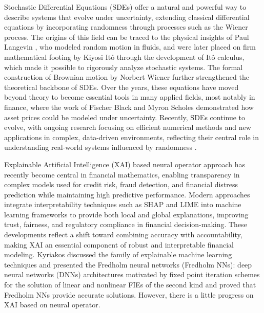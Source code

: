 \documentclass[preprint,12pt,authoryear]{elsarticle}
\begin{document}
Stochastic Differential Equations (SDEs) offer a natural and powerful way to describe systems that evolve under uncertainty, extending classical differential equations by incorporating randomness through processes such as the Wiener process. The origins of this field can be traced to the physical insights of Paul Langevin \cite{langevin1908}, who modeled random motion in fluids, and were later placed on firm mathematical footing by Kiyosi Itô \cite{ito1944} through the development of Itô calculus, which made it possible to rigorously analyze stochastic systems. The formal construction of Brownian motion by Norbert Wiener \cite{wiener1923} further strengthened the theoretical backbone of SDEs. Over the years, these equations have moved beyond theory to become essential tools in many applied fields, most notably in finance, where the work of Fischer Black and Myron Scholes \cite{blackscholes1973} demonstrated how asset prices could be modeled under uncertainty. Recently, SDEs continue to evolve, with ongoing research focusing on efficient numerical methods and new applications in complex, data-driven environments, reflecting their central role in understanding real-world systems influenced by randomness \cite{higham2001}.

Explainable Artificial Intelligence (XAI) based neural operator approach has recently become central in financial mathematics, enabling transparency in complex models used for credit risk, fraud detection, and financial distress prediction while maintaining high predictive performance. Modern approaches integrate interpretability techniques such as SHAP and LIME into machine learning frameworks to provide both local and global explanations, improving trust, fairness, and regulatory compliance in financial decision-making. These developments reflect a shift toward combining accuracy with accountability, making XAI an essential component of robust and interpretable financial modeling. Kyriakos \cite{kyriakos} discussed the family of explainable machine learning techniques and presented the Fredholm neural networks (Fredholm NNs): deep neural networks (DNNs) architectures motivated by fixed point iteration schemes for the solution of linear and nonlinear FIEs of the second kind and proved that Fredholm NNs provide accurate solutions. However, there is a little progress on XAI based on neural operator. 
\end{document}
